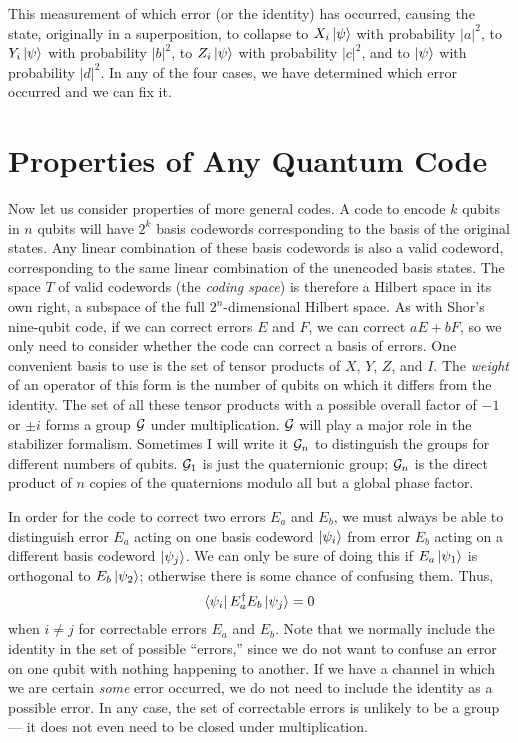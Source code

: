 This measurement of which error (or the identity) has occurred, causing the state, originally in a superposition, to collapse to $X_{i} \ket{\psi}$ with probability $|a|^2$, to $Y_{i} \ket{\psi}$ with probability $|b|^2$, to $Z_{i} \ket{\psi}$ with probability $|c|^2$, and to $\ket{\psi}$ with probability $|d|^2$.
In any of the four cases, we have determined which error occurred and we can fix it.

\section{Properties of Any Quantum Code}
\label{sec-general-prop}

Now let us consider properties of more general codes.  A code to encode
$k$ qubits in $n$ qubits will have $2^k$ basis codewords corresponding to
the basis of the original states.  Any linear combination of these basis
codewords is also a valid codeword, corresponding to the same linear
combination of the unencoded basis states.  The space $T$ of valid
codewords (the {\em coding space}) is therefore a Hilbert space in its own
right, a subspace of the full $2^n$-dimensional Hilbert space.  As with
Shor's nine-qubit code, if we can correct errors $E$ and $F$, we can correct
$aE + bF$, so we only need to consider whether the code can correct a basis of
errors.  One convenient basis to use is the set of tensor products of $X$,
$Y$, $Z$, and $I$.  The {\em weight} of an operator of this form is the
number of qubits on which it differs from the identity.  The set of all these
tensor products with a possible overall factor of $-1$ or $\pm i$ forms a
group ${\cal G}$ under multiplication.  ${\cal G}$ will play a major role in the
stabilizer formalism.  Sometimes I will write it ${\cal G}_n$ to distinguish the
groups for different numbers of qubits.  ${\cal G}_1$ is just the quaternionic
group; ${\cal G}_n$ is the direct product of $n$ copies of the quaternions
modulo all but a global phase factor.

In order for the code to correct two errors $E_a$ and $E_b$, we must
always be able to distinguish error $E_a$ acting on one basis codeword
$\ket{\psi_i}$ from error $E_b$ acting on a different basis codeword
$\ket{\psi_j}$.  We can only be sure of doing this if $E_a \ket{\psi_1}$ is
orthogonal to $E_b \ket{\psi_2}$; otherwise there is some chance of
confusing them.  Thus,
\begin{equation}
	\bra{\psi_i} E_a^\dagger E_b \ket{\psi_j} = 0
	\label{eq-cond-orthogonal}
\end{equation}
when $i \neq j$ for correctable errors $E_a$ and $E_b$.  Note that we
normally include the identity in the set of possible ``errors,'' since we do
not want to confuse an error on one qubit with nothing happening to another.
If we have a channel in which we are certain {\em some} error occurred,
we do not need to include the identity as a possible error.  In any case,
the set of correctable errors is unlikely to be a group --- it does not
even need to be closed under multiplication.

